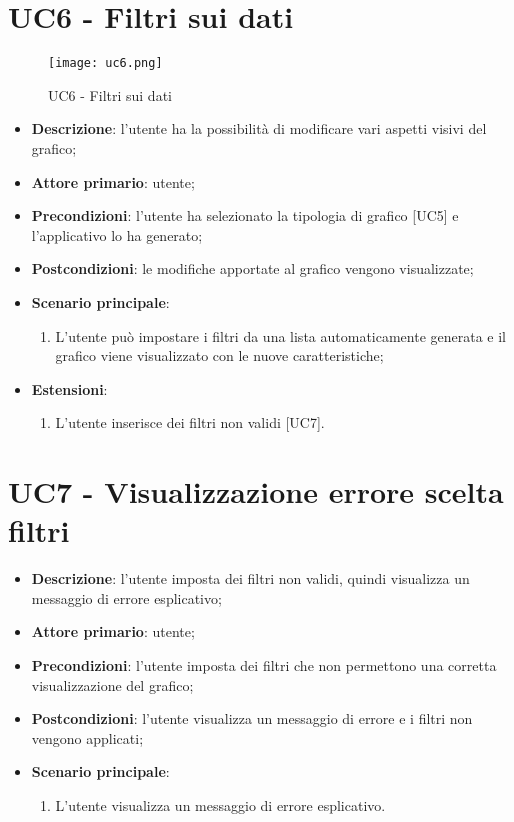 \section{UC6 - Filtri sui dati}
\begin{figure}[H]
  \centering
  \texttt{[image: uc6.png]}
  \caption{UC6 - Filtri sui dati}
\end{figure}

\begin{itemize}
  \item \textbf{Descrizione}: l'utente ha la possibilità di modificare vari aspetti visivi del grafico;
  \item \textbf{Attore primario}: utente;
  \item \textbf{Precondizioni}: l'utente ha selezionato la tipologia di grafico [UC5] e l'applicativo lo ha generato;
  \item \textbf{Postcondizioni}: le modifiche apportate al grafico vengono visualizzate;
  \item \textbf{Scenario principale}:
    \begin{enumerate}
      \item L'utente può impostare i filtri da una lista automaticamente generata e il grafico viene visualizzato con le nuove caratteristiche;
    \end{enumerate}
  \item \textbf{Estensioni}:
    \begin{enumerate}
      \item L'utente inserisce dei filtri non validi [UC7].
    \end{enumerate}
\end{itemize}

\section{UC7 - Visualizzazione errore scelta filtri}
\begin{itemize}
  \item \textbf{Descrizione}: l'utente imposta dei filtri non validi, quindi visualizza un messaggio di errore esplicativo;
  \item \textbf{Attore primario}: utente;
  \item \textbf{Precondizioni}: l'utente imposta dei filtri che non permettono una corretta visualizzazione del grafico;
  \item \textbf{Postcondizioni}: l'utente visualizza un messaggio di errore e i filtri non vengono applicati;
  \item \textbf{Scenario principale}:
    \begin{enumerate}
      \item L'utente visualizza un messaggio di errore esplicativo.
    \end{enumerate}
\end{itemize}

